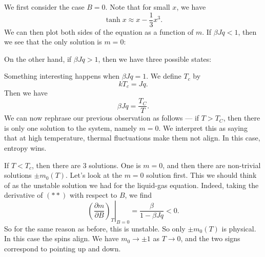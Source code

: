 \documentclass[a4paper]{article}
\begin{document}
We first consider the case $B = 0$. Note that for small $x$, we have
\[
  \tanh x \approx x - \frac{1}{3} x^3.
\]
We can then plot both sides of the equation as a function of $m$. If $\beta Jq < 1$, then we see that the only solution is $m = 0$:
\begin{center}
\end{center}
On the other hand, if $\beta J q > 1$, then we have three possible states:
\begin{center}
\end{center}
Something interesting happens when $\beta Jq = 1$. We define $T_c$ by
\[
  k T_c = Jq.
\]
Then we have
\[
  \beta Jq = \frac{T_C}{T}.
\]
We can now rephrase our previous observation as follows --- if $T > T_C$, then there is only one solution to the system, namely $m = 0$. We interpret this as saying that at high temperature, thermal fluctuations make them not align. In this case, entropy wins.

If $T < T_c$, then there are $3$ solutions. One is $m = 0$, and then there are non-trivial solutions $\pm m_0(T)$. Let's look at the $m = 0$ solution first. This we should think of as the unstable solution we had for the liquid-gas equation. Indeed, taking the derivative of $(**)$ with respect to $B$, we find
\[
  \left.\left(\frac{\partial m}{\partial B}\right)_T\right|_{B = 0} = \frac{\beta}{1 - \beta J q} < 0.
\]
So for the same reason as before, this is unstable. So only $\pm m_0(T)$ is physical. In this case the spins align. We have $m_0 \to \pm1$ as $T \to 0$, and the two signs correspond to pointing up and down.
\end{document}

